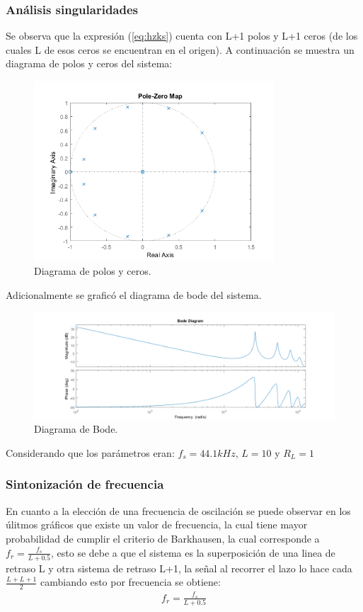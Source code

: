 \subsubsection{Análisis singularidades}
Se observa que la expresión (\ref{eq:hzks}) cuenta con L+1 polos y L+1 ceros (de los cuales L de esos ceros se encuentran en el origen). A continuación se muestra un diagrama de polos y ceros del sistema:
\begin{figure}[H]
	\centering
	\includegraphics[width=0.8\textwidth]{ImagenesEjercicio4/pzks.PNG}
\caption{Diagrama de polos y ceros.}
	\label{fig:zpdig}
\end{figure}
Adicionalmente se graficó el diagrama de bode del sistema.
\begin{figure}[H]
	\centering
	\includegraphics[width=\textwidth]{ImagenesEjercicio4/bodeks.PNG}
\caption{Diagrama de Bode.}

	\label{fig:bode}
\end{figure}
Considerando que los parámetros eran: $f_s = 44.1kHz$, $L=10$ y $R_L=1$
\subsubsection{Sintonización de frecuencia}
En cuanto a la elección de una frecuencia de oscilación se puede observar en los úlitmos gráficos que existe un valor de frecuencia, la cual tiene mayor probabilidad de cumplir el criterio de Barkhausen, la cual corresponde a $f_r = \frac{f_s}{L+0.5}$, esto se debe a que el sistema es la superposición de una linea de retraso  L y otra sistema de retraso L+1, la señal al recorrer el lazo lo hace cada $\frac{L+L+1}{2}$ cambiando esto por frecuencia se obtiene:
\begin{align}
f_r=\frac{f_s}{L+0.5}
\label{eq:fr}
\end{align}
